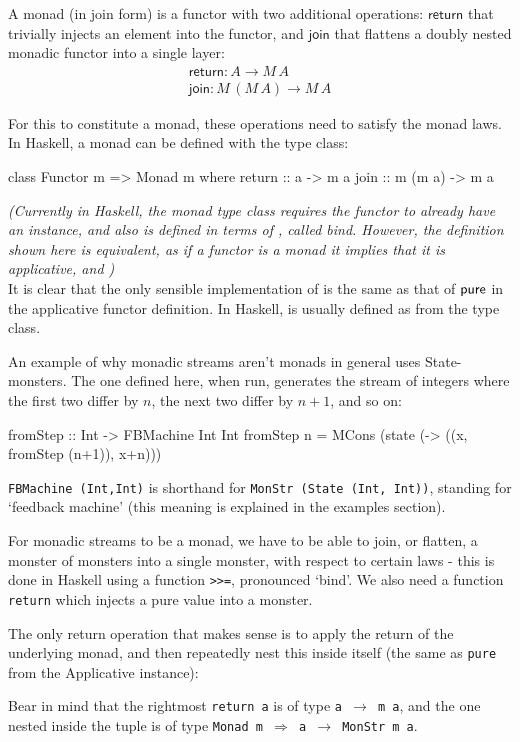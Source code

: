 A monad (in join form) is a functor with two additional operations: $\mathsf{return}$ that trivially injects an element into the functor, and $\mathsf{join}$ that flattens a doubly nested monadic functor into a single layer: 
$$
\begin{array}{l}
\mathsf{return} : A \to M\,A\\
\mathsf{join} : M\,(M\,A) \to M\,A
\end{array}
$$

For this to constitute a monad, these operations need to satisfy the monad laws. 
In Haskell, a monad can be defined with the  type class:

\begin{haskell}
class Functor m => Monad m where
  return :: a -> m a
  join :: m (m a) -> m a
\end{haskell}

\emph{(Currently in Haskell, the monad type class requires the functor to already have an  instance, and also is defined in terms of \hcode{(\ >>=\ )}, called bind. However, the definition shown here is equivalent, as if a functor is a monad it implies that it is applicative, and )}\\

It is clear that the only sensible implementation of  is the same as that of $\mathsf{pure}$ in the applicative functor definition. In Haskell,  is usually defined as  from the  type class.

An example of why monadic streams aren't monads in general uses State-monsters. The one defined here, when run, generates the stream of integers where the first two differ by $n$, the next two differ by $n+1$, and so on:
\begin{haskell}
fromStep :: Int -> FBMachine Int Int
fromStep n = MCons (state (\x -> ((x, fromStep (n+1)), x+n)))
\end{haskell}
\verb+FBMachine (Int,Int)+ is shorthand for \verb+MonStr (State (Int, Int))+, standing for `feedback machine' (this meaning is explained in the examples section).

For monadic streams to be a monad, we have to be able to join, or flatten, a monster of monsters into a single monster, with respect to certain laws - this is done in Haskell using a function \verb+>>=+, pronounced `bind'. We also need a function \verb+return+ which injects a pure value into a monster.

The only return operation that makes sense is to apply the return of the underlying monad, and then repeatedly nest this inside itself (the same as \verb+pure+ from the Applicative instance):
Bear in mind that the rightmost \verb+return a+ is of type \texttt{a $\to$ m a}, and the one nested inside the tuple is of type \texttt{Monad m $\Rightarrow$ a $\to$ MonStr m a}. \\

